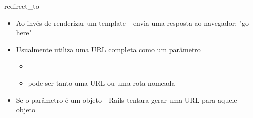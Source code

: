 \begin{frame}{redirect_to}
	\begin{itemize}
		\item Ao invés de renderizar um template - \alert{envia uma resposta} ao navegador:
			"go here" 
		\item Usualmente \alert{utiliza uma URL completa} como um parâmetro
		\begin{itemize}	
			\item \item pode ser tanto uma URL ou uma rota nomeada
		\end{itemize}	
		\item Se o parâmetro é um objeto - Rails tentara \alert{gerar uma URL} para aquele objeto
	\end{itemize}	
\end{frame}